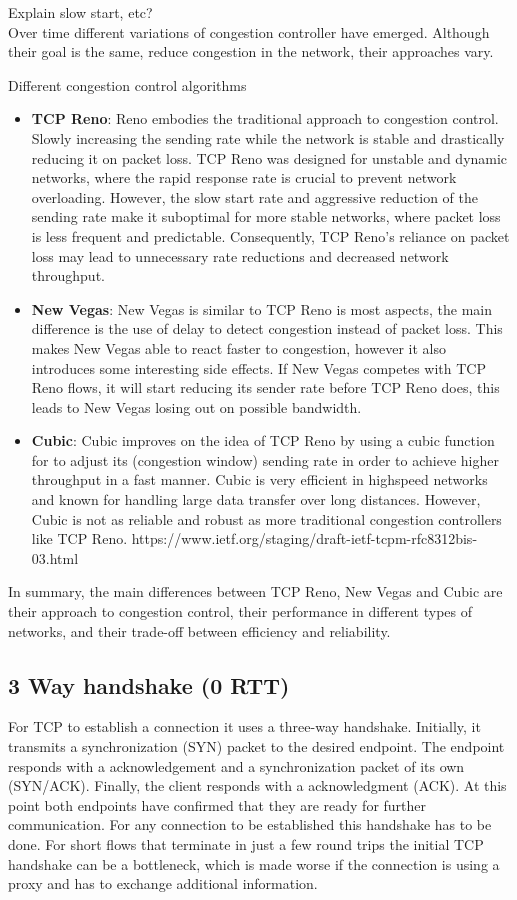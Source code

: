 \documentclass[a4paper,english, 11pt]{report}
\begin{document}
Explain slow start, etc?
\\

Over time different variations of congestion controller have emerged. Although their goal is the same, reduce congestion in the network, their approaches vary. 

Different congestion control algorithms
\begin{itemize}
  \item \textbf{TCP Reno}: Reno embodies the traditional approach to congestion control. Slowly increasing the sending rate while the network is stable and drastically reducing it on packet loss. TCP Reno was designed for unstable and dynamic networks, where the rapid response rate is crucial to prevent network overloading. However, the slow start rate and aggressive reduction of the sending rate make it suboptimal for more stable networks, where packet loss is less frequent and predictable. Consequently, TCP Reno's reliance on packet loss may lead to unnecessary rate reductions and decreased network throughput.
  \item \textbf{New Vegas}: New Vegas is similar to TCP Reno is most aspects, the main difference is the use of delay to detect congestion instead of packet loss. This makes New Vegas able to react faster to congestion, however it also introduces some interesting side effects. If New Vegas competes with TCP Reno flows, it will start reducing its sender rate before TCP Reno does, this leads to New Vegas losing out on possible bandwidth. 
  \item \textbf{Cubic}: Cubic improves on the idea of TCP Reno by using a cubic function for to adjust its (congestion window) sending rate in order to achieve higher throughput in a fast manner. Cubic is very efficient in highspeed networks and known for handling large data transfer over long distances. However, Cubic is not as reliable and robust as more traditional congestion controllers like TCP Reno. https://www.ietf.org/staging/draft-ietf-tcpm-rfc8312bis-03.html
\end{itemize}

In summary, the main differences between TCP Reno, New Vegas and Cubic are their approach to congestion control, their performance in different types of networks, and their trade-off between efficiency and reliability.

\subsection{3 Way handshake (0 RTT)}
For TCP to establish a connection it uses a three-way handshake. Initially, it transmits a synchronization (SYN) packet to the desired endpoint. The endpoint responds with a acknowledgement and a synchronization packet of its own (SYN/ACK). Finally, the client responds with a acknowledgment (ACK). At this point both endpoints have confirmed that they are ready for further communication. For any connection to be established this handshake has to be done. For short flows that terminate in just a few round trips the initial TCP handshake can be a bottleneck, which is made worse if the connection is using a proxy and has to exchange additional information. 
\end{document}
